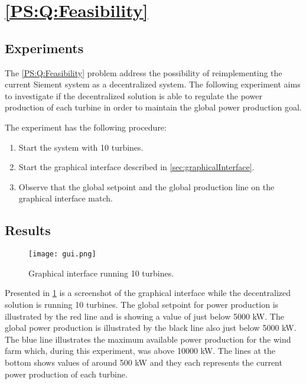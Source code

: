 
\section{\ref{PS:Q:Feasibility}}
\subsection{Experiments}

The \ref{PS:Q:Feasibility} problem address the possibility of reimplementing the current Siement system as a decentralized system. The following experiment aims to investigate if the decentralized solution is able to regulate the power production of each turbine in order to maintain the global power production goal.

The experiment has the following procedure:
\begin{enumerate}
	\item Start the system with 10 turbines.
	\item Start the graphical interface described in \cref{sec:graphicalInterface}.
	\item Observe that the global setpoint and the global production line on the graphical interface match.
\end{enumerate}

\subsection{Results}
\label{sec:exp:feasibility}
\begin{figure} [!h]
	\centering
	\texttt{[image: gui.png]} 
	\caption[Graphical interface running 10 turbines]{
		\label{fig:graphicalInterface} 
		\footnotesize{%
			Graphical interface running 10 turbines.
		}
	}
\end{figure}

Presented in \cref{fig:graphicalInterface} is a screenshot of the graphical interface while the decentralized solution is running 10 turbines.
The global setpoint for power production is illustrated by the red line and is showing a value of just below 5000 kW. The global power production is illustrated by the black line also just below 5000 kW.
The blue line illustrates the maximum available power production for the wind farm which, during this experiment, was above 10000 kW. The lines at the bottom shows values of around 500 kW and they each represents the current power production of each turbine.

